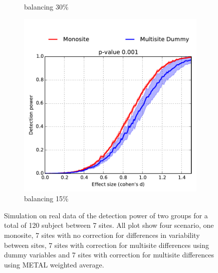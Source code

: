 \documentclass[authoryear]{elsarticle}
\begin{document}
\begin{figure}
\begin{subfigure}[b]{0.31\textwidth}
            {{\tiny balancing 30\%}}    
            \label{fig:mean and std of net24}
        \end{subfigure}
        \hfill
        \begin{subfigure}[b]{0.31\textwidth}   
            \centering 
            \includegraphics[width=\textwidth]{../figures/realdata_detect_pow_s120_15pct.pdf}
            {{\tiny balancing 15\%}}    
            \label{fig:mean and std of net34}
        \end{subfigure}
        \caption[]
        {\small Simulation on real data of the detection power of two groups for a total of 120 subject between 7 sites. All plot show four scenario, one monosite, 7 sites with no correction for differences in variability between sites, 7 sites with correction for multisite differences using dummy variables and 7 sites with correction for multisite differences using METAL weighted average.} 
        \label{fig:real_sim_samplesize_varbalancing}
    \end{figure}
    
\end{document}
